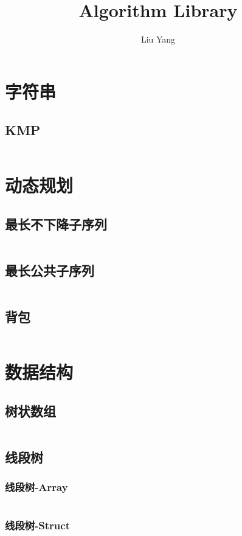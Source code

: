 \documentclass[a4paper,11pt]{article}
\author{Liu Yang}
\title{Algorithm Library}
\begin{document}
 
\maketitle %
\newpage %
\tableofcontents %
\newpage
\section{字符串}
\subsection{KMP}
\inputminted[breaklines]{c++}{字符串/KMP.cpp}
\section{动态规划}
\subsection{最长不下降子序列}
\inputminted[breaklines]{c++}{动态规划/最长不下降子序列_LIS.cpp}
\subsection{最长公共子序列}
\inputminted[breaklines]{c++}{动态规划/最长公共子序列_LCS.cpp}
\subsection{背包}
\inputminted[breaklines]{c++}{动态规划/背包.cpp}
\section{数据结构}
\subsection{树状数组}
\inputminted[breaklines]{c++}{数据结构/树状数组.cpp}
\subsection{线段树}
\subsubsection{线段树-Array}
\inputminted[breaklines]{c++}{数据结构/线段树.cpp}
\subsubsection{线段树-Struct}
\inputminted[breaklines]{c++}{数据结构/线段树-Struct.cpp}
\end{document}
